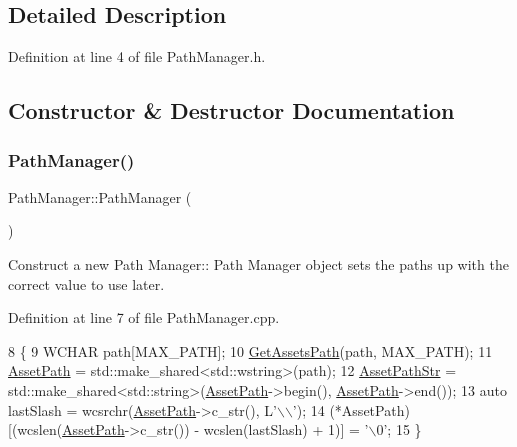 \subsection{Detailed Description}


Definition at line 4 of file Path\+Manager.\+h.



\subsection{Constructor \& Destructor Documentation}
\mbox{\label{class_path_manager_a9d91d6b3fcb797f77e7eace2bbf798bd}} 
\subsubsection{\texorpdfstring{Path\+Manager()}{PathManager()}}
{\footnotesize\ttfamily Path\+Manager\+::\+Path\+Manager (\begin{DoxyParamCaption}{ }\end{DoxyParamCaption})}



Construct a new Path Manager\+:\+: Path Manager object sets the paths up with the correct value to use later. 



Definition at line 7 of file Path\+Manager.\+cpp.


\begin{DoxyCode}
8 \{
9     WCHAR path[MAX\_PATH];
10     \mbox{\hyperlink{_direct_x_helper_8h_ae43aaa2c2b87c4e0260c082d56ab3477}{GetAssetsPath}}(path, MAX\_PATH);
11     \mbox{\hyperlink{class_path_manager_aa10cc8c03331c77828bf9e155644d018}{AssetPath}} = std::make\_shared<std::wstring>(path);
12     \mbox{\hyperlink{class_path_manager_ad037448c8b23e1c60c89ad7d3e188d3a}{AssetPathStr}} = std::make\_shared<std::string>(\mbox{\hyperlink{class_path_manager_aa10cc8c03331c77828bf9e155644d018}{AssetPath}}->begin(), 
      \mbox{\hyperlink{class_path_manager_aa10cc8c03331c77828bf9e155644d018}{AssetPath}}->end());
13     \textcolor{keyword}{auto} lastSlash = wcsrchr(\mbox{\hyperlink{class_path_manager_aa10cc8c03331c77828bf9e155644d018}{AssetPath}}->c\_str(), L\textcolor{charliteral}{'\(\backslash\)\(\backslash\)'});
14     (*AssetPath)[(wcslen(\mbox{\hyperlink{class_path_manager_aa10cc8c03331c77828bf9e155644d018}{AssetPath}}->c\_str()) - wcslen(lastSlash) + 1)] = \textcolor{charliteral}{'\(\backslash\)0'};
15 \}
\end{DoxyCode}
\mbox{\label{class_path_manager_ac666917e7caaa1e4a56e5eab764b3ec7}} 
